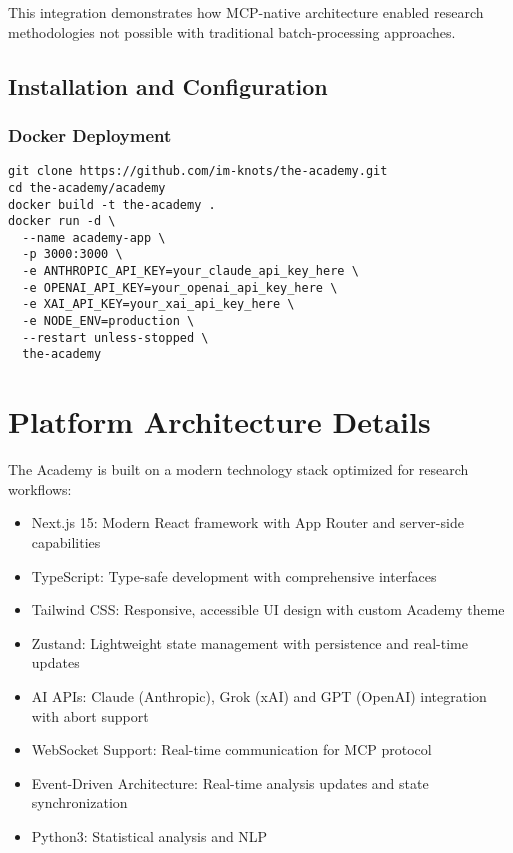 \documentclass[11pt,letterpaper]{article}
\newcommand{\theacademy}{The Academy}
\begin{document}
This integration demonstrates how MCP-native architecture enabled research methodologies not possible with traditional batch-processing approaches.

\subsection{Installation and Configuration}

\subsubsection{Docker Deployment}
\begin{verbatim}
git clone https://github.com/im-knots/the-academy.git
cd the-academy/academy
docker build -t the-academy .
docker run -d \
  --name academy-app \
  -p 3000:3000 \
  -e ANTHROPIC_API_KEY=your_claude_api_key_here \
  -e OPENAI_API_KEY=your_openai_api_key_here \
  -e XAI_API_KEY=your_xai_api_key_here \
  -e NODE_ENV=production \
  --restart unless-stopped \
  the-academy
\end{verbatim}

\section{Platform Architecture Details}
\label{app:architecture}

\theacademy{} is built on a modern technology stack optimized for research workflows:

\begin{itemize}
    \item Next.js 15: Modern React framework with App Router and server-side capabilities
    \item TypeScript: Type-safe development with comprehensive interfaces
    \item Tailwind CSS: Responsive, accessible UI design with custom Academy theme
    \item Zustand: Lightweight state management with persistence and real-time updates
    \item AI APIs: Claude (Anthropic), Grok (xAI) and GPT (OpenAI) integration with abort support
    \item WebSocket Support: Real-time communication for MCP protocol
    \item Event-Driven Architecture: Real-time analysis updates and state synchronization
    \item Python3: Statistical analysis and NLP
\end{itemize}
\end{document}

